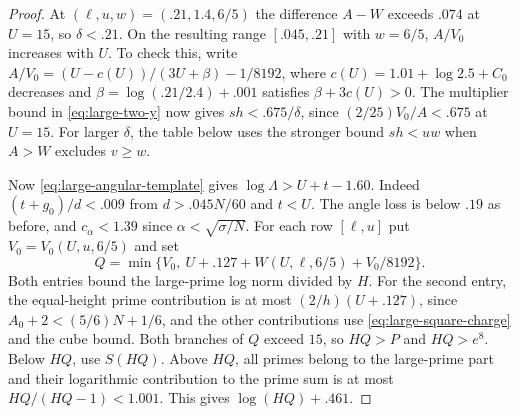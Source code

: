 \begin{proof}
At \((\ell,u,w)=(.21,1.4,6/5)\) the difference \(A-W\)
exceeds \(.074\) at \(U=15\), so \(\delta<.21\).
On the resulting range \([.045,.21]\) with \(w=6/5\),
\(A/V_0\) increases with \(U\). To check this, write
\(A/V_0=(U-c(U))/(3U+\beta)-1/8192\),
where \(c(U)=1.01+\log2.5+C_0\) decreases and
\(\beta=\log(.21/2.4)+.001\) satisfies \(\beta+3c(U)>0\).
The multiplier bound in \eqref{eq:large-two-y} now gives
\(sh<.675/\delta\), since \((2/25)V_0/A<.675\) at \(U=15\).
For larger \(\delta\), the table below uses the stronger
bound \(sh<uw\) when \(A>W\) excludes \(v\ge w\).

Now \eqref{eq:large-angular-template} gives
\(\log\Lambda>U+t-1.60\). Indeed \((t+g_0)/d<.009\)
from \(d>.045N/60\) and \(t<U\). The angle loss is below
\(.19\) as before, and \(c_\alpha<1.39\) since
\(\alpha<\sqrt{\sigma/N}\).
For each row \([\ell,u]\) put \(V_0=V_0(U,u,6/5)\) and set
\[
 Q=\min\{V_0,\ U+.127+W(U,\ell,6/5)+V_0/8192\}.
\]
Both entries bound the large-prime log norm divided by \(H\).
For the second entry, the equal-height prime contribution
is at most \((2/h)(U+.127)\), since
\(A_0+2<(5/6)N+1/6\), and the other contributions use
\eqref{eq:large-square-charge} and the cube bound.
Both branches of \(Q\) exceed \(15\), so \(HQ>P\)
and \(HQ>e^8\). Below \(HQ\), use \(S(HQ)\).
Above \(HQ\), all primes belong to the large-prime part
and their logarithmic contribution to the prime sum is
at most \(HQ/(HQ-1)<1.001\). This gives \(\log(HQ)+.461\).


\end{proof}
